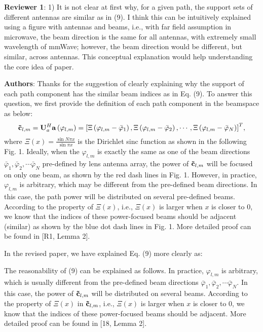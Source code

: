 \documentclass[a4paper,12pt]{article}
\begin{document}
\textbf{Reviewer 1}: 1) It is not clear at first why, for a given path, the support sets of different antennas are similar as in (9). I think this can be intuitively explained using a figure with antennas and beams, i.e., with far field assumption in microwave, the beam direction is the same for all antennas, with extremely small wavelength of mmWave; however, the beam direction would be different, but similar, across antennas. This conceptual explanation would help understanding the core idea of paper.

{\color{blue} \textbf{Authors}: Thanks for the suggestion of clearly explaining why the support of each path component has the similar beam indices as in Eq. (9). To answer this question, we first provide the definition of each path component in the beamspace as below:
$$
{{\bf{\tilde c}}_{l,m}} = {\bf{U}}_a^H{\bf{a}}\left( {{\varphi _{l,m}}} \right) = {\left[ {\Xi \left( {{\varphi _{l,m}} - {{\bar \varphi }_1}} \right),\Xi \left( {{\varphi _{l,m}} - {{\bar \varphi }_2}} \right), \cdots ,\Xi \left( {{\varphi _{l,m}} - {{\bar \varphi }_N}} \right)} \right]^T},
$$
where ${\Xi \left( x \right) = \frac{{\sin N\pi x}}{{\sin \pi x}}}$ is the Dirichlet sinc function as shown in the following Fig. 1. Ideally, when the ${{{\varphi _{l,m}}}}$ is exactly the same as one of the beam directions ${{\bar \varphi _1},{\bar \varphi _2}, \cdots {\bar \varphi _N}}$ pre-defined by lens antenna array, the power of ${{{\bf{\tilde c}}_{l,m}}}$ will be focused on only one beam, as shown by the red dash lines in Fig. 1. However, in practice, ${{{\varphi _{l,m}}}}$ is arbitrary, which may be different from the pre-defined beam directions. In this case, the path power will be distributed on several pre-defined beams. According to the property of ${\Xi \left( x \right)}$, i.e., ${\Xi \left( x \right)}$ is larger when ${x}$ is closer to 0, we know that the indices of these power-focused beams should be adjacent (similar) as shown by the blue dot dash lines in Fig. 1. More detailed proof can be found in [R1, Lemma 2].



In the revised paper, we have explained Eq. (9) more clearly as:
\begin{framed}
{\color{red} The reasonability of (9) can be explained as follows. In practice, ${{{\varphi _{l,m}}}}$ is arbitrary, which is usually different from the pre-defined beam directions ${{\bar \varphi _1},{\bar \varphi _2}, \cdots {\bar \varphi _N}}$. In this case, the power of ${{{\bf{\tilde c}}_{l,m}}}$ will be distributed on several beams. According to the property of ${\Xi \left( x \right)}$ in ${{{\bf{\tilde c}}_{l,m}}}$, i.e., ${\Xi \left( x \right)}$ is larger when ${x}$ is closer to 0, we know that the indices of these power-focused beams should be adjacent. More detailed proof can be found in [18, Lemma 2].}
\end{framed}


}
\end{document}

